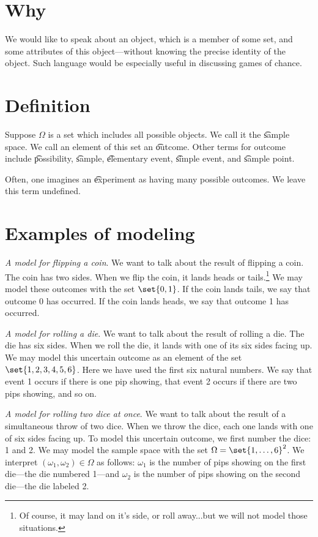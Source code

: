 
\section*{Why}

We would like to speak about an object, which is a member of some set, and some attributes of this object---without knowing the precise identity of the object.
Such language would be especially useful in discussing games of chance.

\section*{Definition}

Suppose $\Omega $ is a set which includes all possible objects.
We call it the \t{sample space}.
We call an element of this set an \t{outcome}.
Other terms for outcome include \t{possibility}, \t{sample}, \t{elementary event}, \t{simple event}, and \t{sample point}.

Often, one imagines an \t{experiment} as having many possible outcomes.
We leave this term undefined.

\section*{Examples of modeling}

\textit{A model for flipping a coin}.
We want to talk about the result of flipping a coin.
The coin has two sides.
When we flip the coin, it lands heads or tails.\footnote{Of course, it may land on it's side, or roll away...but we will not model those situations.}
We may model these outcomes with the set $\set{0, 1}$.
If the coin lands tails, we say that outcome 0 has occurred.
If the coin lands heads, we say that outcome 1 has occurred.

\textit{A model for rolling a die}.
We want to talk about the result of rolling a die.
The die has six sides.
When we roll the die, it lands with one of its six sides facing up.
We may model this uncertain outcome as an element of the set $\set{1, 2, 3, 4, 5, 6}$.
Here we have used the first six natural numbers.
We say that event 1 occurs if there is one pip showing, that event 2 occurs if there are two pips showing, and so on.

\textit{A model for rolling two dice at once}.
We want to talk about the result of a simultaneous throw of two dice.
When we throw the dice, each one lands with one of six sides facing up.
To model this uncertain outcome, we first number the dice: 1 and 2.
We may model the sample space with the set $\Omega  = \set{1, \dots , 6}^2$.
We interpret $(\omega _1, \omega _2) \in \Omega $ as follows: $\omega _1$ is the number of pips showing on the first die---the die numbered 1---and $\omega _2$ is the number of pips showing on the second die---the die labeled 2.


